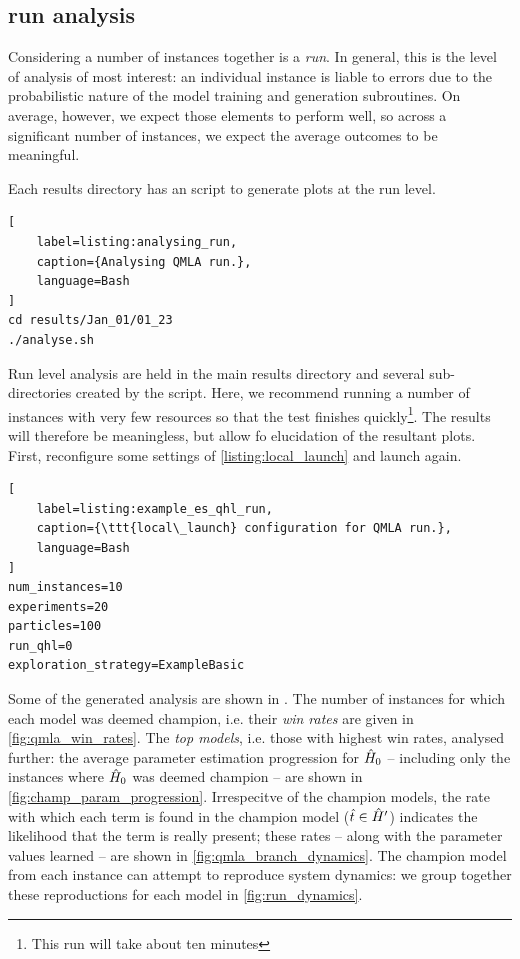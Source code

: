 \subsection{\Gls{run} analysis}
Considering a number of \glspl{instance} together is a \emph{\gls{run}}. 
In general, this is the level of analysis of most interest: 
    an individual instance is liable to errors due to the probabilistic nature of 
    the model training and generation subroutines. 
On average, however, we expect those elements to perform well, 
    so across a significant number of instances, we expect the average outcomes to be meaningful. 
\par 

Each \gls{results directory} has an  script to generate plots at the \gls{run} level. 
\begin{lstlisting}[
    label=listing:analysing_run,
    caption={Analysing QMLA run.},
    language=Bash
]
cd results/Jan_01/01_23
./analyse.sh
\end{lstlisting}

Run level analysis are held in the main \gls{results directory} and several sub-directories created by the  script. 
Here, we recommend running a number of \glspl{instance} with very few resources so that the test finishes quickly\footnote{This \gls{run} will take about ten minutes}. 
The results will therefore be meaningless, but allow fo elucidation of the resultant plots. 
First, reconfigure some settings of \cref{listing:local_launch} and launch again.
\begin{lstlisting}[
    label=listing:example_es_qhl_run,
    caption={\ttt{local\_launch} configuration for QMLA run.},
    language=Bash
]
num_instances=10
experiments=20
particles=100
run_qhl=0
exploration_strategy=ExampleBasic
\end{lstlisting}
\par 

Some of the generated analysis are shown in . 
The number of \glspl{instance} for which each model was deemed \gls{champion}, 
i.e. their \emph{\glspl{win rate}} are given in \cref{fig:qmla_win_rates}.
The \emph{top models}, i.e. those with highest \glspl{win rate}, analysed further: 
    the average parameter estimation progression for $\hat{H}_0$ -- including only the \glspl{instance} where $\hat{H}_0$ was deemed champion --
    are shown in \cref{fig:champ_param_progression}.
Irrespecitve of the \glspl{champion model}, the rate with which each term is found in the \gls{champion model} ($\hat{t} \in \hat{H}^{\prime}$)
    indicates the \gls{likelihood} that the term is really present;
    these rates -- along with the parameter values learned -- are shown in \cref{fig:qmla_branch_dynamics}.
The \gls{champion model} from each \gls{instance} can attempt to reproduce system dynamics: 
    we group together these reproductions for each model in \cref{fig:run_dynamics}. 

